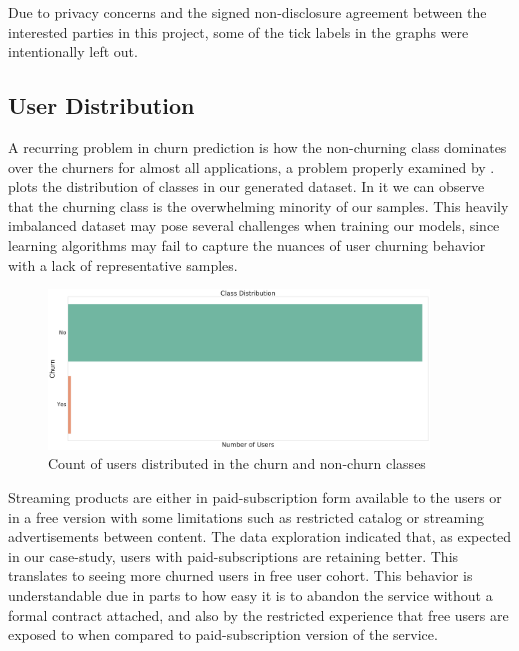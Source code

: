 \documentclass{kththesis}
\begin{document}
Due to privacy concerns and the signed non-disclosure agreement between the interested parties in this project, some of the tick labels in the graphs were intentionally left out.

\subsection{User Distribution}

A recurring problem in churn prediction is how the non-churning class dominates over the churners for almost all applications, a problem properly examined by \citep{Burez2009}.  plots the distribution of classes in our generated dataset. In it we can observe that the churning class is the overwhelming minority of our samples. This heavily imbalanced dataset may pose several challenges when training our models, since learning algorithms may fail to capture the nuances of user churning behavior with a lack of representative samples.

	\begin{figure}[H]
    \centering
    \includegraphics[width=0.9\textwidth,height=0.9\textheight,keepaspectratio]{figures/class_dist.pdf}
    \caption{Count of users distributed in the churn and non-churn classes}
    \label{fig:classdist}
	\end{figure}

Streaming products are either in paid-subscription form available to the users or in a free version with some limitations such as restricted catalog or streaming advertisements between content. The data exploration indicated that, as expected in our case-study, users with paid-subscriptions are retaining better. This translates to seeing more churned users in free user cohort. This behavior is understandable due in parts to how easy it is to abandon the service without a formal contract attached, and also by the restricted experience that free users are exposed to when compared to paid-subscription version of the service.
\end{document}
